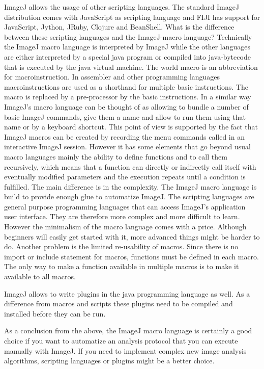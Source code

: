 ImageJ allows the usage of other scripting languages. The standard ImageJ distribution comes with JavaScript as scripting language and FIJI has support for JavaScript, Jython, JRuby, Clojure and BeanShell. What is the difference between these scripting languages and the ImageJ-macro language? Technically the ImageJ macro language is interpreted by ImageJ while the other languages are either interpreted by a special java program or compiled into java-bytecode that is executed by the java virtual machine. The world macro is an abbreviation for macroinstruction. In assembler and other programming languages macroinstructions are used as a shorthand for multiple basic instructions. The macro is replaced by a pre-processor by the basic instructions. In a similar way ImageJ's macro language can be thought of as allowing to bundle a number of basic ImageJ commands, give them a name and allow to run them using that name or by a keyboard shortcut. This point of view is supported by the fact that ImageJ macros can be created by recording the menu commands called  in an interactive ImageJ session. However it has some elements that go beyond usual macro languages mainly the ability to define functions and to call them recursively, which means that a function can directly or indirectly call itself with eventually modified parameters and the execution repeats until a condition is fulfilled. The main difference is in the complexity. The ImageJ macro language is build to provide enough glue to automatize ImageJ. The scripting languages are general purpose programming languages that can access ImageJ's application user interface. They are therefore more complex and more difficult to learn. However the minimalism of the macro language comes with a price. Although beginners will easily get started with it, more advanced things might be harder to do. Another problem is the limited re-usability of macros. Since there is no import or include statement for macros, functions must be defined in each macro. The only way to make a function available in multiple macros is to make it available to all macros.

ImageJ allows to write plugins in the java programming language as well. As a difference from macros and scripts these plugins need to be compiled and installed before they can be run. 

As a conclusion from the above, the ImageJ macro language is certainly a good choice if you want to automatize an analysis protocol that you can execute manually with ImageJ. If you need to implement complex new image analysis algorithms, scripting languages or plugins might be a better choice.         

